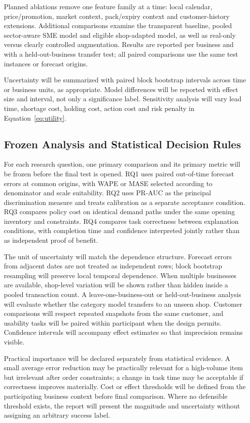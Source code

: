 Planned ablations remove one feature family at a time: local calendar,
price/promotion, market context, pack/expiry context and customer-history
extensions. Additional comparisons examine the transparent baseline, pooled
sector-aware SME model and eligible shop-adapted model, as well as real-only
versus clearly controlled augmentation. Results are reported per business and
with a held-out-business transfer test; all paired comparisons use the same test
instances or forecast origins.

Uncertainty will be summarized with paired block bootstrap intervals across
time or business units, as appropriate. Model differences will be reported with
effect size and interval, not only a significance label. Sensitivity analysis
will vary lead time, shortage cost, holding cost, action cost and risk penalty in
Equation~\ref{eq:utility}.

\subsection{Frozen Analysis and Statistical Decision Rules}

For each research question, one primary comparison and its primary metric will
be frozen before the final test is opened. RQ1 uses paired out-of-time forecast
errors at common origins, with WAPE or MASE selected according to denominator
and scale suitability. RQ2 uses PR-AUC as the principal discrimination measure
and treats calibration as a separate acceptance condition. RQ3 compares policy
cost on identical demand paths under the same opening inventory and constraints.
RQ4 compares task correctness between explanation conditions, with completion
time and confidence interpreted jointly rather than as independent proof of
benefit.

The unit of uncertainty will match the dependence structure. Forecast errors
from adjacent dates are not treated as independent rows; block bootstrap
resampling will preserve local temporal dependence. When multiple businesses
are available, shop-level variation will be shown rather than hidden inside a
pooled transaction count. A leave-one-business-out or held-out-business analysis
will evaluate whether the category model transfers to an unseen shop. Customer comparisons will respect repeated snapshots
from the same customer, and usability tasks will be paired within participant
when the design permits. Confidence intervals will accompany effect estimates
so that imprecision remains visible.

Practical importance will be declared separately from statistical evidence. A
small average error reduction may be practically relevant for a high-volume
item but irrelevant after order constraints; a change in task time may be
acceptable if correctness improves materially. Cost or effect thresholds will
be defined from the participating business context before final comparison.
Where no defensible threshold exists, the report will present the magnitude and
uncertainty without assigning an arbitrary success label.

